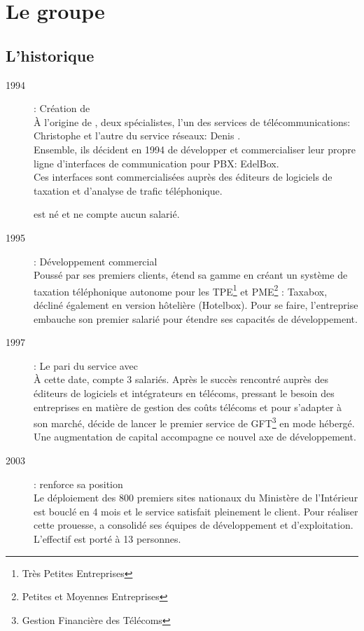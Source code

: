 \chapter{Le groupe \mbx{}}
	\section{L'historique}
	\begin{description}
		\item[1994] : Création de \memobox{}\\
			\`A l'origine de \memobox{}, deux spécialistes, l'un des services de télécommunications: Christophe  et l'autre du service réseaux: Denis .\\
			Ensemble, ils décident en 1994 de développer et commercialiser leur propre ligne d'interfaces de communication pour PBX: EdelBox.\\
			Ces interfaces sont commercialisées auprès des éditeurs de logiciels de taxation et d'analyse de trafic téléphonique.

			\memobox{} est né et ne compte aucun salarié.
		
		\item[1995] : Développement commercial\\
			Poussé par ses premiers clients, \memobox{} étend sa gamme en créant un système de taxation téléphonique autonome pour les TPE\footnote{Très Petites Entreprises} et PME\footnote{Petites et Moyennes Entreprises} : Taxabox, décliné également en version hôtelière (Hotelbox).
			Pour se faire, l'entreprise embauche son premier salarié pour étendre ses capacités de développement.
			
		\item[1997] : Le pari du service avec \adt{}\\
			\`A cette date, \memobox{} compte 3 salariés. Après le succès rencontré auprès des éditeurs
			de logiciels et intégrateurs en télécoms, \memobox{} pressant le besoin des entreprises en matière de gestion des coûts télécoms et pour s'adapter
			à son marché, décide de lancer \adt{} le premier service de GFT\footnote{Gestion Financière des Télécoms} en mode hébergé. Une augmentation de capital accompagne ce nouvel axe de développement.
			
		\item[2003] : \memobox{} renforce sa position\\
			Le déploiement des 800 premiers sites nationaux du Ministère de l'Intérieur est bouclé en 4 mois
			et le service satisfait pleinement le client. Pour réaliser cette prouesse, \memobox{} a consolidé ses équipes de développement et d'exploitation.  L'effectif est porté à 13 personnes.
			

\end{description}
